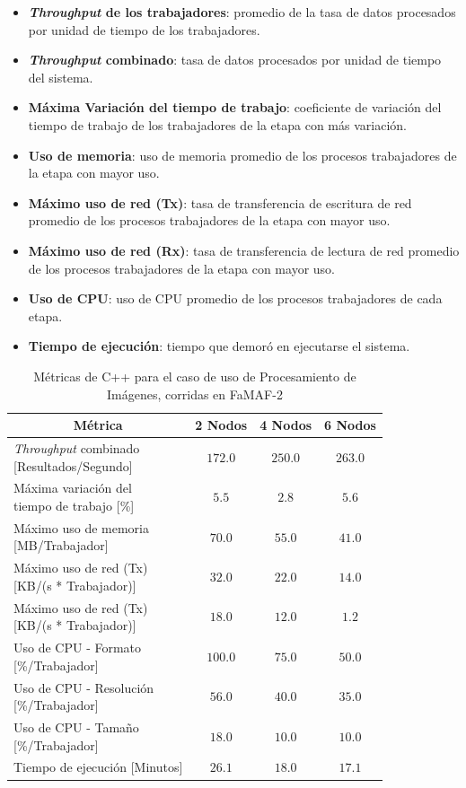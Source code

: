 \documentclass[11pt]{article}
\providecommand{\row}[1]{\parbox{150pt}{\setlength{\baselineskip}{0.2\baselineskip}\strut#1\strut}}
\newcommand{\ipcap}[2]{\caption{Métricas de #1 para el caso de uso de Procesamiento de Imágenes, corridas en #2}}
\newcommand{\english}[1]{\textit{#1}}
\begin{document}
\begin{itemize}
    \item \textbf{\english{Throughput} de los trabajadores}: promedio de la tasa de datos procesados por unidad de tiempo de los trabajadores.
    \item \textbf{\english{Throughput} combinado}: tasa de datos procesados por unidad de tiempo del sistema.
    \item \textbf{Máxima Variación  del tiempo de trabajo}: coeficiente de variación del tiempo de trabajo de los trabajadores de la etapa con más variación.
    \item \textbf{Uso de memoria}: uso de memoria promedio de los procesos trabajadores de la etapa con mayor uso.
    \item \textbf{Máximo uso de red (Tx)}: tasa de transferencia de escritura de red promedio de los procesos trabajadores de la etapa con mayor uso.
    \item \textbf{Máximo uso de red (Rx)}: tasa de transferencia de lectura de red promedio de los procesos trabajadores de la etapa con mayor uso.
    \item \textbf{Uso de CPU}: uso de CPU promedio de los procesos trabajadores de cada etapa.
    \item \textbf{Tiempo de ejecución}: tiempo que demoró en ejecutarse el sistema.
\end{itemize}


\begin{table}[H]
\centering
\begin{tabular}{|l|c|c|c|}
\hline
\multicolumn{1}{|c|}{Métrica} & 2 Nodos & 4 Nodos & 6 Nodos \\ \hline
\row{\english{Throughput} combinado\\{[Resultados/Segundo]}} & $172.0$ & $250.0$ & $263.0$ \\ \hline
\row{Máxima variación del \\ tiempo de trabajo {[}\%{]}} & $5.5$ & $2.8$ & $5.6$ \\ \hline
\row{Máximo uso de memoria \\ {[MB/Trabajador]}} & $70.0$ & $55.0$ & $41.0$ \\ \hline
\row{Máximo uso de red (Tx) \\ {[KB/(s * Trabajador)]}} & $32.0$ & $22.0$ & $14.0$ \\ \hline
\row{Máximo uso de red (Tx) \\ {[KB/(s * Trabajador)]}} & $18.0$ & $12.0$ & $1.2$  \\ \hline
\row{Uso de CPU - Formato\\{[\%/Trabajador]}} & $100.0$ & $75.0$  & $50.0$ \\ \hline
\row{Uso de CPU - Resolución\\{[\%/Trabajador]}} & $56.0$ & $40.0$ & $35.0$ \\ \hline
\row{Uso de CPU - Tamaño\\{[\%/Trabajador]}} & $18.0$ & $10.0$ & $10.0$ \\ \hline
Tiempo de ejecución [Minutos] & $26.1$ & $18.0$ & $17.1$ \\ \hline
\end{tabular}
\ipcap{C++}{FaMAF-2}
\end{table}
\end{document}
